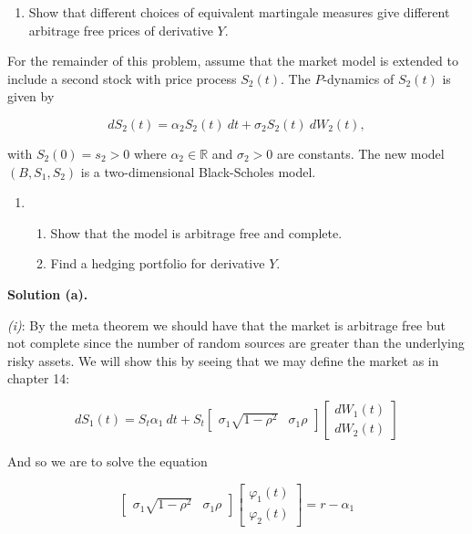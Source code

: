\documentclass[a4paper,12pt,openany]{book}
\providecommand{\tightlist}{%
 \setlength{\itemsep}{0pt}\setlength{\parskip}{0pt}}
\begin{document}
\begin{enumerate}
\def\labelenumi{\alph{enumi}.}
\setcounter{enumi}{3}
\tightlist
\item
  Show that different choices of equivalent martingale measures give different arbitrage free prices of derivative \(Y\).
\end{enumerate}

For the remainder of this problem, assume that the market model is extended to include a second stock with price process \(S_2(t)\). The \(P\)-dynamics of \(S_2(t)\) is given by

\[
dS_2(t)=\alpha_2S_2(t)\ dt+\sigma_2 S_2(t)\ dW_2(t),
\]

with \(S_2(0)=s_2>0\) where \(\alpha_2\in\mathbb{R}\) and \(\sigma_2>0\) are constants. The new model \((B,S_1,S_2)\) is a two-dimensional Black-Scholes model.

\begin{enumerate}
\def\labelenumi{\alph{enumi}.}
\setcounter{enumi}{4}
\item
  \begin{enumerate}
  \def\labelenumii{\roman{enumii}.}
  \tightlist
  \item
    Show that the model is arbitrage free and complete.
  \item
    Find a hedging portfolio for derivative \(Y\).
  \end{enumerate}
\end{enumerate}

\noindent\makebox[\linewidth]{\rule{\textwidth}{0.4pt}}

\textbf{Solution (a).}

\emph{(i)}: By the meta theorem we should have that the market is arbitrage free but not complete since the number of random sources are greater than the underlying risky assets. We will show this by seeing that we may define the market as in chapter 14:

\[
dS_1(t)=S_t \alpha_1\ dt+S_t
\begin{bmatrix}
\sigma_1\sqrt{1-\rho^2} & \sigma_1\rho
\end{bmatrix}
\begin{bmatrix}
dW_1(t)\\
dW_2(t)
\end{bmatrix}
\]

And so we are to solve the equation

\[
\begin{bmatrix}
\sigma_1\sqrt{1-\rho^2} & \sigma_1\rho
\end{bmatrix}
\begin{bmatrix}
\varphi_1(t)\\
\varphi_2(t)
\end{bmatrix}=r-\alpha_1
\]
\end{document}
